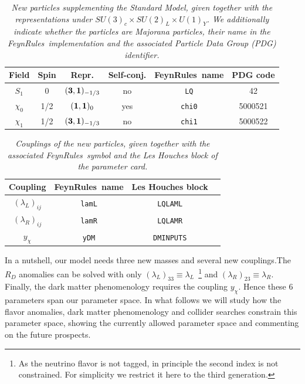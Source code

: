 \documentclass[11pt]{cernrep}
\def\sss{\scriptscriptstyle}
\def\ydm{y_{\sss \chi}}
\newcommand{\fr}{{\sc \small FeynRules}}
\begin{document}
\begin{table}[h]
\renewcommand{\arraystretch}{1.4}
\setlength\tabcolsep{8pt}
\begin{tabular}{c c c c c c}
  Field & Spin & Repr. & Self-conj. & \fr\ name & PDG code\\
  \hline\hline
  $S_1$    & 0   & $({\bf 3}, {\bf 1})_{-1/3}$ & no  & {\tt LQ} & 42\\
  $\chi_0$ & 1/2 & $({\bf 1}, {\bf 1})_0$      & yes & {\tt chi0} & 5000521\\
  $\chi_1$ & 1/2 & $({\bf 3}, {\bf 1})_{-1/3}$ & no  & {\tt chi1} & 5000522\\
\end{tabular}
\caption{\it New particles supplementing the Standard Model, given
  together with the representations under $SU(3)_c\times SU(2)_L \times U(1)_Y$.
  We additionally indicate whether the particles are Majorana particles,
  their name in the \fr\ implementation and the associated Particle Data Group
  (PDG) identifier.}
\label{tab:fields}
\end{table}

\begin{table}[h]
\renewcommand{\arraystretch}{1.4}
\setlength\tabcolsep{15pt}
\begin{tabular}{c c c c}
  Coupling & \fr\ name & Les Houches block\\
  \hline\hline
  $(\lambda_{\sss L})_{ij}$ & {\tt lamL} & {\tt LQLAML}\\
  $(\lambda_{\sss R})_{ij}$ & {\tt lamR} & {\tt LQLAMR}\\
  $\ydm$ & {\tt yDM} & {\tt DMINPUTS}\\
\end{tabular}
\caption{\it Couplings of the new particles, given together with the associated
  \fr\ symbol and the Les Houches block of the parameter card.}
\label{tab:params}
\end{table}
In a nutshell, our model needs three new masses and several new couplings.The $R_D$ anomalies can be solved with only $(\lambda_{\sss L})_{33} \equiv \lambda_L$~\footnote{As the neutrino flavor is not tagged, in principle the second index is not constrained. For simplicity we restrict it here to the third generation.} and $(\lambda_{\sss R})_{23} \equiv \lambda_R$. Finally, the dark matter phenomenology requires the coupling $\ydm$. Hence these 6 parameters span our parameter space. In what follows we will study how the flavor anomalies, dark matter phenomenology and collider searches constrain this parameter space, showing the currently allowed parameter space and commenting on the future prospects. 
\end{document}
